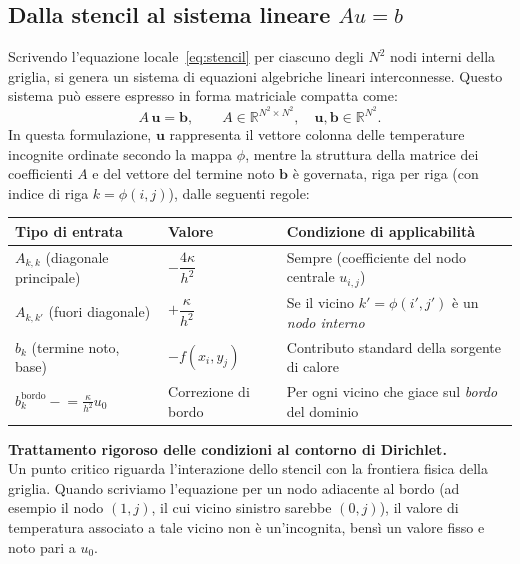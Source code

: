 \documentclass[a4paper,11pt]{article}
\theoremstyle{definition}
\begin{document}
\subsection{Dalla stencil al sistema lineare $Au=b$}

Scrivendo l'equazione locale~\eqref{eq:stencil} per ciascuno degli $N^2$ nodi interni della griglia, si genera un sistema di equazioni algebriche lineari interconnesse. Questo sistema può essere espresso in forma matriciale compatta come:
\[
  A\,\mathbf{u} = \mathbf{b},
  \qquad A \in \mathbb{R}^{N^2 \times N^2},\quad
  \mathbf{u},\mathbf{b} \in \mathbb{R}^{N^2}.
\]
In questa formulazione, $\mathbf{u}$ rappresenta il vettore colonna delle temperature incognite ordinate secondo la mappa $\phi$, mentre la struttura della matrice dei coefficienti $A$ e del vettore del termine noto $\mathbf{b}$ è governata, riga per riga (con indice di riga $k = \phi(i,j)$), dalle seguenti regole:

\begin{center}
\renewcommand{\arraystretch}{1.5}
\begin{tabular}{lll}
\toprule
\textbf{Tipo di entrata} & \textbf{Valore} & \textbf{Condizione di applicabilità} \\
\midrule
$A_{k,k}$ (diagonale principale) & $-\dfrac{4\kappa}{h^2}$ & Sempre (coefficiente del nodo centrale $u_{i,j}$) \\[6pt]
$A_{k,k'}$ (fuori diagonale)     & $+\dfrac{\kappa}{h^2}$  & Se il vicino $k' = \phi(i', j')$ è un \emph{nodo interno} \\[6pt]
$b_k$ (termine noto, base)      & $-f(x_i,y_j)$           & Contributo standard della sorgente di calore \\[4pt]
$b_k^{\mathrm{bordo}} \mathrel{-}= \frac{\kappa}{h^2}u_0$ & Correzione di bordo & Per ogni vicino che giace sul \emph{bordo} del dominio \\
\bottomrule
\end{tabular}
\end{center}

\medskip
\noindent\textbf{Trattamento rigoroso delle condizioni al contorno di Dirichlet.} \\
Un punto critico riguarda l'interazione dello stencil con la frontiera fisica della griglia. Quando scriviamo l'equazione per un nodo adiacente al bordo (ad esempio il nodo $(1, j)$, il cui vicino sinistro sarebbe $(0, j)$), il valore di temperatura associato a tale vicino non è un'incognita, bensì un valore fisso e noto pari a $u_0$. 
\end{document}
